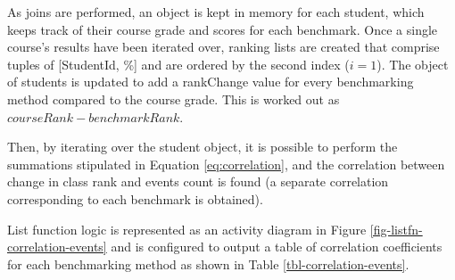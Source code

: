 As joins are performed, an object is kept in memory for each student, which keeps track of their course grade and scores for each benchmark. Once a single course’s results have been iterated over, ranking lists are created that comprise tuples of [StudentId, \%] and are ordered by the second index ($i = 1$). The object of students is updated to add a rankChange value for every benchmarking method compared to the course grade. This is worked out as $courseRank - benchmarkRank$.

Then, by iterating over the student object, it is possible to perform the summations stipulated in Equation \ref{eq:correlation}, and the correlation between change in class rank and events count is found (a separate correlation corresponding to each benchmark is obtained).

List function logic is represented as an activity diagram in Figure \ref{fig-listfn-correlation-events} and is configured to output a table of correlation coefficients for each benchmarking method as shown in Table \ref{tbl-correlation-events}.

